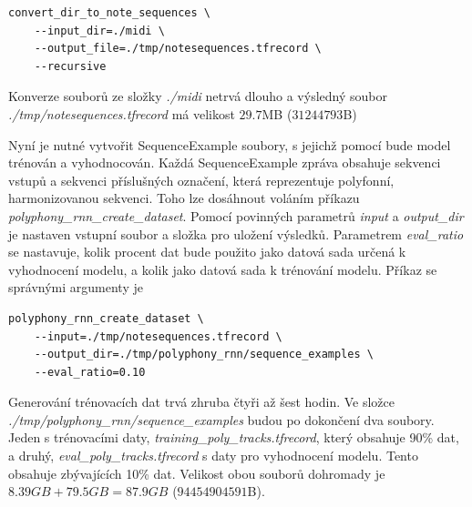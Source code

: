 \begin{verbatim}
convert_dir_to_note_sequences \
    --input_dir=./midi \
    --output_file=./tmp/notesequences.tfrecord \
    --recursive
\end{verbatim} 

Konverze souborů ze složky \emph{./midi} netrvá dlouho
a výsledný soubor \emph{./tmp/notesequences.tfrecord}
má velikost $29.7$MB ($31 244 793$B)
\par

Nyní je nutné vytvořit SequenceExample soubory,
s jejichž pomocí bude model trénován a vyhodnocován.
Každá SequenceExample zpráva obsahuje sekvenci vstupů a
sekvenci příslušných označení, 
která reprezentuje polyfonní, harmonizovanou sekvenci.
Toho lze dosáhnout voláním příkazu \emph{polyphony\_rnn\_create\_dataset}.
Pomocí povinných parametrů \emph{input} a \emph{output\_dir} 
je nastaven vstupní soubor a složka pro uložení výsledků.
Parametrem \emph{eval\_ratio} se nastavuje, kolik procent dat 
bude použito jako datová sada určená k vyhodnocení modelu,
a kolik jako datová sada k trénování modelu.
\cite{google_git_polyphony}
Příkaz se správnými argumenty je

\begin{verbatim}
polyphony_rnn_create_dataset \
    --input=./tmp/notesequences.tfrecord \
    --output_dir=./tmp/polyphony_rnn/sequence_examples \
    --eval_ratio=0.10
\end{verbatim}

Generování trénovacích dat trvá zhruba čtyři až šest hodin.
Ve složce \emph{./tmp/polyphony\_rnn/sequence\_examples} budou po dokončení
dva soubory. 
Jeden s trénovacími daty, \emph{training\_poly\_tracks.tfrecord},
který obsahuje 90\% dat,
a druhý, \emph{eval\_poly\_tracks.tfrecord} s daty pro vyhodnocení modelu.
Tento obsahuje zbývajících 10\% dat.
Velikost obou souborů dohromady je $8.39GB + 79.5GB = 87.9GB$ ($94 454 904 591$B).
\par

